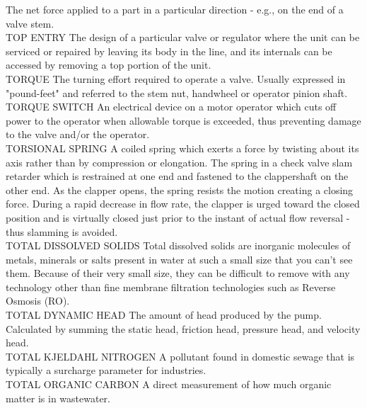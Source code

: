 The net force applied to a part in a particular direction - e.g., on the end of a valve stem.
\vspace{0.3cm}\\
TOP ENTRY
The design of a particular valve or regulator where the unit can be serviced or repaired by leaving its body in the line, and its internals can be accessed by removing a top portion of the unit.
\vspace{0.3cm}\\
TORQUE
The turning effort required to operate a valve. Usually expressed in "pound-feet" and referred to the stem nut, handwheel or operator pinion shaft.
\vspace{0.3cm}\\
TORQUE SWITCH
An electrical device on a motor operator which cuts off power to the operator when allowable torque is exceeded, thus preventing damage to the valve and/or the operator.
\vspace{0.3cm}\\
TORSIONAL SPRING
A coiled spring which exerts a force by twisting about its axis rather than by compression or elongation. The spring in a check valve slam retarder which is restrained at one end and fastened to the clappershaft on the other end. As the clapper opens, the spring resists the motion creating a closing force. During a rapid decrease in flow rate, the clapper is urged toward the closed position and is virtually closed just prior to the instant of actual flow reversal - thus slamming is avoided.
\vspace{0.3cm}\\
TOTAL DISSOLVED SOLIDS
Total dissolved solids are inorganic molecules of metals, minerals or salts present in water at such a small size that you can’t see them. Because of their very small size, they can be difficult to remove with any technology other than fine membrane filtration technologies such as Reverse Osmosis (RO).
\vspace{0.3cm}\\
TOTAL DYNAMIC HEAD
The amount of head produced by the pump. Calculated by summing the static head, friction head, pressure head, and velocity head.
\vspace{0.3cm}\\
TOTAL KJELDAHL NITROGEN
A pollutant found in domestic sewage that is typically a surcharge parameter for industries.
\vspace{0.3cm}\\
TOTAL ORGANIC CARBON
A direct measurement of how much organic matter is in wastewater.
